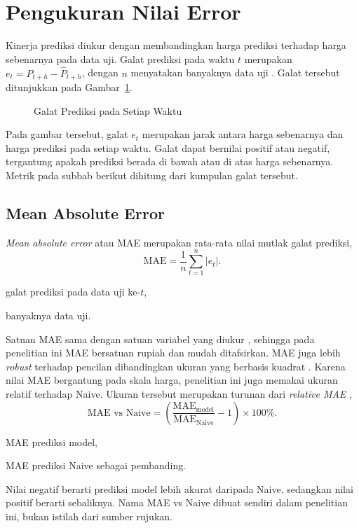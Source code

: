 \section{Pengukuran Nilai Error}
Kinerja prediksi diukur dengan membandingkan harga prediksi terhadap harga
sebenarnya pada data uji. Galat prediksi pada waktu $t$ merupakan
$e_t = P_{t+h} - \hat{P}_{t+h}$, dengan $n$ menyatakan banyaknya data uji
\cite{hyndman2006}. Galat tersebut ditunjukkan pada Gambar~\ref{fig:galat}.

\begin{figure}[!htbp]
  \centering
  \caption{Galat Prediksi pada Setiap Waktu}
  \label{fig:galat}
\end{figure}

Pada gambar tersebut, galat $e_t$ merupakan jarak antara
harga sebenarnya dan harga prediksi pada setiap waktu. Galat dapat bernilai
positif atau negatif, tergantung apakah prediksi berada di bawah atau di atas
harga sebenarnya. Metrik pada subbab berikut dihitung dari kumpulan galat
tersebut.

\subsection{Mean Absolute Error}
\label{subsec:mae}
\textit{Mean absolute error} atau MAE merupakan rata-rata nilai mutlak galat
prediksi,
\begin{equation}
  \text{MAE} = \frac{1}{n}\sum_{t=1}^{n} \lvert e_t \rvert .
  \label{eq:mae}
\end{equation}
\begin{keterangan}
  \item[$e_t$] galat prediksi pada data uji ke-$t$,
  \item[$n$] banyaknya data uji.
\end{keterangan}
Satuan MAE sama dengan satuan variabel yang diukur \cite{willmott2005},
sehingga pada penelitian ini MAE bersatuan rupiah dan mudah ditafsirkan.
MAE juga lebih \textit{robust} terhadap pencilan dibandingkan ukuran yang
berbasis kuadrat \cite{hodson2022}.
Karena nilai MAE bergantung pada skala harga, penelitian ini juga memakai
ukuran relatif terhadap Naive. Ukuran tersebut merupakan turunan dari
\textit{relative MAE} \cite{hyndman2006},
\begin{equation}
  \text{MAE vs Naive} =
  \left(\frac{\text{MAE}_{\text{model}}}{\text{MAE}_{\text{Naive}}} - 1\right)
  \times 100\% .
  \label{eq:maenaive}
\end{equation}
\begin{keterangan}
  \item[$\text{MAE}_{\text{model}}$] MAE prediksi model,
  \item[$\text{MAE}_{\text{Naive}}$] MAE prediksi Naive sebagai
    pembanding.
\end{keterangan}
Nilai negatif berarti prediksi model lebih akurat daripada Naive,
sedangkan nilai positif berarti sebaliknya. Nama MAE vs Naive dibuat sendiri dalam penelitian ini, bukan istilah dari sumber rujukan.

